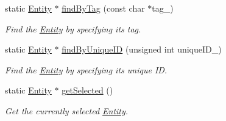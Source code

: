 \begin{DoxyCompactItemize}
static \hyperlink{class_i_dream_sky_1_1_entity}{Entity} $\ast$ \hyperlink{class_i_dream_sky_1_1_entity_ac39f9be772d7d8bb3ca77a441e05d5d2}{find\+By\+Tag} (const char $\ast$tag\+\_\+)
\begin{DoxyCompactList}\small\item\em Find the \hyperlink{class_i_dream_sky_1_1_entity}{Entity} by specifying its tag. \end{DoxyCompactList}\item 
static \hyperlink{class_i_dream_sky_1_1_entity}{Entity} $\ast$ \hyperlink{class_i_dream_sky_1_1_entity_a3e59b521e341639b1242f39583b77ff2}{find\+By\+Unique\+ID} (unsigned int unique\+I\+D\+\_\+)
\begin{DoxyCompactList}\small\item\em Find the \hyperlink{class_i_dream_sky_1_1_entity}{Entity} by specifying its unique ID. \end{DoxyCompactList}\item 
static \hyperlink{class_i_dream_sky_1_1_entity}{Entity} $\ast$ \hyperlink{class_i_dream_sky_1_1_entity_a6f25a85b01d260b79b2d9f4950bf8cc0}{get\+Selected} ()
\begin{DoxyCompactList}\small\item\em Get the currently selected \hyperlink{class_i_dream_sky_1_1_entity}{Entity}. \end{DoxyCompactList}\end{DoxyCompactItemize}
